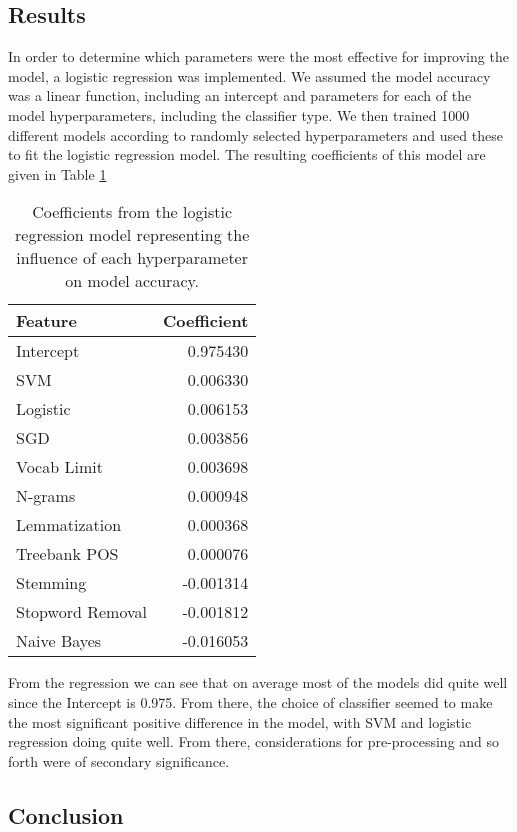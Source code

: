 \documentclass[
10pt, %
a4paper, %
oneside, %
headinclude,footinclude, %
BCOR5mm, %
]{scrartcl}
\begin{document}
\subsection{Results}

In order to determine which parameters were the most effective for improving the model, a logistic regression was implemented. We assumed the model accuracy was a linear function, including an intercept and parameters for each of the model hyperparameters, including the classifier type. We then trained 1000 different models according to randomly selected hyperparameters and used these to fit the logistic regression model. The resulting coefficients of this model are given in Table \ref{tab:my_label}

\begin{table}[h]
  \centering
  \begin{tabular}{lr}
    \toprule
    Feature & Coefficient \\
    \midrule
    Intercept & 0.975430 \\
    SVM & 0.006330 \\
    Logistic & 0.006153 \\
    SGD & 0.003856 \\
    Vocab Limit & 0.003698 \\
    N-grams & 0.000948 \\
    Lemmatization & 0.000368 \\
    Treebank POS & 0.000076 \\
    Stemming & -0.001314 \\
    Stopword Removal & -0.001812 \\
    Naive Bayes & -0.016053 \\
    \bottomrule
  \end{tabular}
  \caption{Coefficients from the logistic regression model representing the influence of each hyperparameter on model accuracy.}
  \label{tab:my_label}
\end{table}

From the regression we can see that on average most of the models did quite well since the Intercept is 0.975. From there, the choice of classifier seemed to make the most significant positive difference in the model, with SVM and logistic regression doing quite well. From there, considerations for pre-processing and so forth were of secondary significance.

\subsection{Conclusion}
\end{document}
